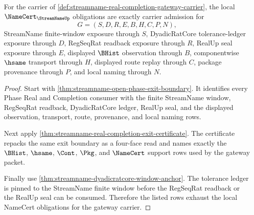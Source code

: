 \begin{theorem}
\label{thm:streamname-real-completion-gateway-obligations}
For the carrier of \autoref{def:streamname-real-completion-gateway-carrier}, the local $\NameCert_{\StreamNameUp}$ obligations are exactly carrier admission for
$$
G=(S,D,R,E,B,H,C,P,N),
$$
StreamName finite-window exposure through $S$, DyadicRatCore tolerance-ledger exposure through $D$, RegSeqRat readback exposure through $R$, RealUp seal exposure through $E$, displayed $\BHist$ observation through $B$, componentwise $\hsame$ transport through $H$, displayed route replay through $C$, package provenance through $P$, and local naming through $N$.
\end{theorem}
\begin{proof}
Start with \autoref{thm:streamname-open-phase-exit-boundary}. It identifies every Phase Real and Completion consumer with the finite StreamName window, RegSeqRat readback, DyadicRatCore ledger, RealUp seal, and the displayed observation, transport, route, provenance, and local naming rows.

Next apply \autoref{thm:streamname-real-completion-exit-certificate}. The certificate repacks the same exit boundary as a four-face read and names exactly the $\BHist$, $\hsame$, $\Cont$, $\Pkg$, and $\NameCert$ support rows used by the gateway packet.

Finally use \autoref{thm:streamname-dyadicratcore-window-anchor}. The tolerance ledger is pinned to the StreamName finite window before the RegSeqRat readback or the RealUp seal can be consumed. Therefore the listed rows exhaust the local NameCert obligations for the gateway carrier.
\end{proof}

